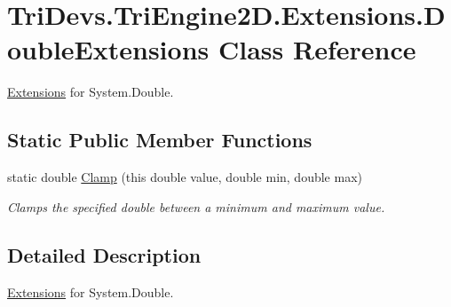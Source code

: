 \hypertarget{class_tri_devs_1_1_tri_engine2_d_1_1_extensions_1_1_double_extensions}{\section{Tri\-Devs.\-Tri\-Engine2\-D.\-Extensions.\-Double\-Extensions Class Reference}
\label{class_tri_devs_1_1_tri_engine2_d_1_1_extensions_1_1_double_extensions}
}


\hyperlink{namespace_tri_devs_1_1_tri_engine2_d_1_1_extensions}{Extensions} for System.\-Double.  


\subsection*{Static Public Member Functions}
\begin{DoxyCompactItemize}
\item 
static double \hyperlink{class_tri_devs_1_1_tri_engine2_d_1_1_extensions_1_1_double_extensions_ace1b97481b33360d43459090a7a509c8}{Clamp} (this double value, double min, double max)
\begin{DoxyCompactList}\small\item\em Clamps the specified double between a minimum and maximum value. \end{DoxyCompactList}\end{DoxyCompactItemize}


\subsection{Detailed Description}
\hyperlink{namespace_tri_devs_1_1_tri_engine2_d_1_1_extensions}{Extensions} for System.\-Double. 



